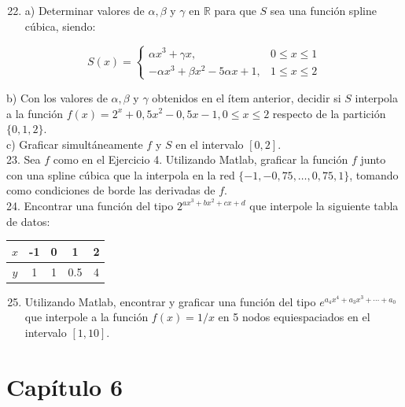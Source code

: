 \documentclass[10pt]{article}
\begin{document}
\begin{enumerate}
  \setcounter{enumi}{21}
  \item a) Determinar valores de $\alpha, \beta$ y $\gamma$ en $\mathbb{R}$ para que $S$ sea una función spline cúbica, siendo:
\end{enumerate}

$$
S(x)= \begin{cases}\alpha x^{3}+\gamma x, & 0 \leq x \leq 1 \\ -\alpha x^{3}+\beta x^{2}-5 \alpha x+1, & 1 \leq x \leq 2\end{cases}
$$

b) Con los valores de $\alpha, \beta$ y $\gamma$ obtenidos en el ítem anterior, decidir si $S$ interpola a la función $f(x)=2^{x}+0,5 x^{2}-0,5 x-1,0 \leq x \leq 2$ respecto de la partición $\{0,1,2\}$.\\
c) Graficar simultáneamente $f$ y $S$ en el intervalo $[0,2]$.\\
23. Sea $f$ como en el Ejercicio 4. Utilizando Matlab, graficar la función $f$ junto con una spline cúbica que la interpola en la red $\{-1,-0,75, \ldots, 0,75,1\}$, tomando como condiciones de borde las derivadas de $f$.\\
24. Encontrar una función del tipo $2^{a x^{3}+b x^{2}+c x+d}$ que interpole la siguiente tabla de datos:

\begin{center}
\begin{tabular}{|c|c|c|c|c|}
\hline
$x$ & -1 & 0 & 1 & 2 \\
\hline
$y$ & 1 & 1 & 0.5 & 4 \\
\hline
\end{tabular}
\end{center}

\begin{enumerate}
  \setcounter{enumi}{24}
  \item Utilizando Matlab, encontrar y graficar una función del tipo $e^{a_{4} x^{4}+a_{3} x^{3}+\cdots+a_{0}}$ que interpole a la función $f(x)=1 / x$ en 5 nodos equiespaciados en el intervalo $[1,10]$.
\end{enumerate}

\section*{Capítulo 6}
\end{document}
